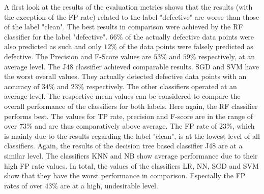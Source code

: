 A first look at the results of the evaluation metrics shows that the results (with the exception of the FP rate) related to the label "defective" are worse than those of the label "clean". The best results in comparison were achieved by the RF classifier for the label "defective". $66\%$ of the actually defective data points were also predicted as such and only $12\%$ of the data points were falsely predicted as defective. The Precision and F-Score values are $53\%$ and $59\%$ respectively, at an average level. The J48 classifier achieved comparable results. SGD and SVM have the worst overall values. They actually detected defective data points with an accuracy of $34\%$ and $23\%$ respectively. The other classifiers operated at an average level. The respective mean values can be considered to compare the overall performance of the classifiers for both labels. Here again, the RF classifier performs best. The values for TP rate, precision and F-score are in the range of over $73\%$ and are thus comparatively above average. The FP rate of $23\%$, which is mainly due to the results regarding the label "clean", is at the lowest level of all classifiers. Again, the results of the decision tree based classifier J48 are at a similar level. The classifiers KNN and NB show average performance due to their high FP rate values. In total, the values of the classifiers LR, NN, SGD and SVM show that they have the worst performance in comparison. Especially the FP rates of over $43\%$ are at a high, undesirable level. 


